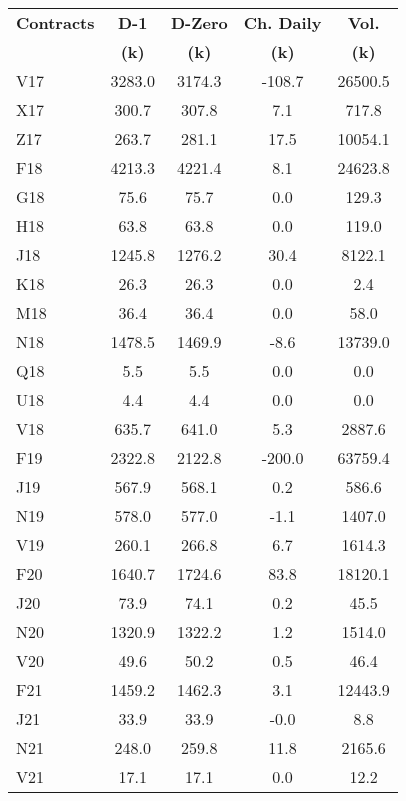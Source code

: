 \documentclass[article,crop=false]{standalone}%
\begin{document}
%
\normalsize%
\setlength{\tabcolsep}{0.15cm}%
\begin{tabular}[h]{l | c c c c}%
\hline%
\rowcolor{white}%
\textbf{Contracts}&\textbf{D{-}1}&\textbf{D{-}Zero}&\textbf{Ch. Daily}&\textbf{Vol.}\\%
\rowcolor{white}%
\textbf{}&\textbf{(k)}&\textbf{(k)}&\textbf{(k)}&\textbf{(k)}\\%
\hline%
\rowcolor{lightgray}%
V17&3283.0&3174.3&{-}108.7&26500.5\\%
\rowcolor{white}%
X17&300.7&307.8&7.1&717.8\\%
\rowcolor{lightgray}%
Z17&263.7&281.1&17.5&10054.1\\%
\rowcolor{white}%
F18&4213.3&4221.4&8.1&24623.8\\%
\rowcolor{lightgray}%
G18&75.6&75.7&0.0&129.3\\%
\rowcolor{white}%
H18&63.8&63.8&0.0&119.0\\%
\rowcolor{lightgray}%
J18&1245.8&1276.2&30.4&8122.1\\%
\rowcolor{white}%
K18&26.3&26.3&0.0&2.4\\%
\rowcolor{lightgray}%
M18&36.4&36.4&0.0&58.0\\%
\rowcolor{white}%
N18&1478.5&1469.9&{-}8.6&13739.0\\%
\rowcolor{lightgray}%
Q18&5.5&5.5&0.0&0.0\\%
\rowcolor{white}%
U18&4.4&4.4&0.0&0.0\\%
\rowcolor{lightgray}%
V18&635.7&641.0&5.3&2887.6\\%
\rowcolor{white}%
F19&2322.8&2122.8&{-}200.0&63759.4\\%
\rowcolor{lightgray}%
J19&567.9&568.1&0.2&586.6\\%
\rowcolor{white}%
N19&578.0&577.0&{-}1.1&1407.0\\%
\rowcolor{lightgray}%
V19&260.1&266.8&6.7&1614.3\\%
\rowcolor{white}%
F20&1640.7&1724.6&83.8&18120.1\\%
\rowcolor{lightgray}%
J20&73.9&74.1&0.2&45.5\\%
\rowcolor{white}%
N20&1320.9&1322.2&1.2&1514.0\\%
\rowcolor{lightgray}%
V20&49.6&50.2&0.5&46.4\\%
\rowcolor{white}%
F21&1459.2&1462.3&3.1&12443.9\\%
\rowcolor{lightgray}%
J21&33.9&33.9&{-}0.0&8.8\\%
\rowcolor{white}%
N21&248.0&259.8&11.8&2165.6\\%
\rowcolor{lightgray}%
V21&17.1&17.1&0.0&12.2\\%

\end{tabular}
\end{document}
